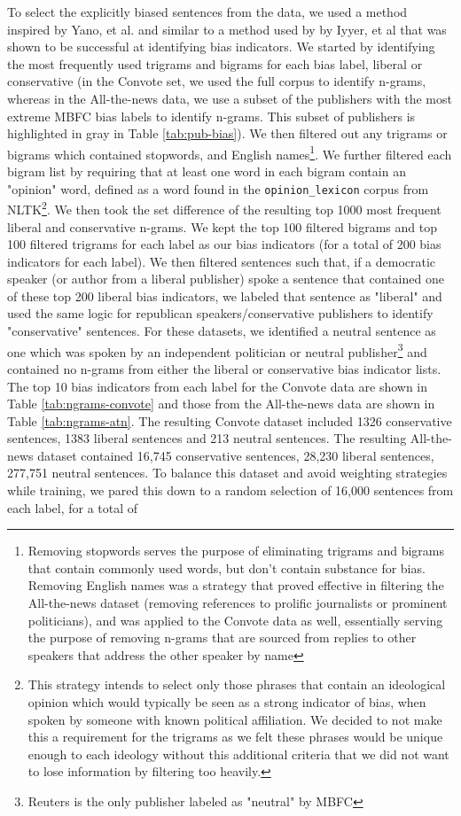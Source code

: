 \documentclass[10pt,a4paper,onecolumn]{article}
\begin{document}
To select the explicitly biased sentences from the data, we used a method inspired by Yano, et al. \cite{YanoBigrams} and similar to a method used by by Iyyer, et al \cite{iyyerRNN} that was shown to be successful at identifying bias indicators. We started by identifying the most frequently used trigrams and bigrams for each bias label, liberal or conservative (in the Convote set, we used the full corpus to identify n-grams, whereas in the All-the-news data, we use a subset of the publishers with the most extreme MBFC bias labels to identify n-grams. This subset of publishers is highlighted in gray in Table \ref{tab:pub-bias}). We then filtered out any trigrams or bigrams which contained stopwords, and English names\footnote{Removing stopwords serves the purpose of eliminating trigrams and bigrams that contain commonly used words, but don't contain substance for bias. Removing English names was a strategy that proved effective in filtering the All-the-news dataset (removing references to prolific journalists or prominent politicians), and was applied to the Convote data as well, essentially serving the purpose of removing n-grams that are sourced from replies to other speakers that address the other speaker by name}. We further filtered each bigram list by requiring that at least one word in each bigram contain an "opinion" word, defined as a word found in the \texttt{opinion\_lexicon} corpus from NLTK\footnote{This strategy intends to select only those phrases that contain an ideological opinion which would typically be seen as a strong indicator of bias, when spoken by someone with known political affiliation. We decided to not make this a requirement for the trigrams as we felt these phrases would be unique enough to each ideology without this additional criteria that we did not want to lose information by filtering too heavily.}. We then took the set difference of the resulting top 1000 most frequent liberal and conservative n-grams. We kept the top 100 filtered bigrams and top 100 filtered trigrams for each label as our bias indicators (for a total of 200 bias indicators for each label). We then filtered sentences such that, if a democratic speaker (or author from a liberal publisher) spoke a sentence that contained one of these top 200 liberal bias indicators, we labeled that sentence as "liberal" and used the same logic for republican speakers/conservative publishers to identify "conservative" sentences. For these datasets, we identified a neutral sentence as one which was spoken by an independent politician or neutral publisher\footnote{Reuters is the only publisher labeled as "neutral" by MBFC} and contained no n-grams from either the liberal or conservative bias indicator lists. The top 10 bias indicators from each label for the Convote data are shown in Table \ref{tab:ngrams-convote} and those from the All-the-news data are shown in Table \ref{tab:ngrams-atn}. The resulting Convote dataset included 1326 conservative sentences, 1383 liberal sentences and 213 neutral sentences. The resulting All-the-news dataset contained 16,745 conservative sentences, 28,230 liberal sentences, 277,751 neutral sentences. To balance this dataset and avoid weighting strategies while training, we pared this down to a random selection of 16,000 sentences from each label, for a total of 
\end{document}
